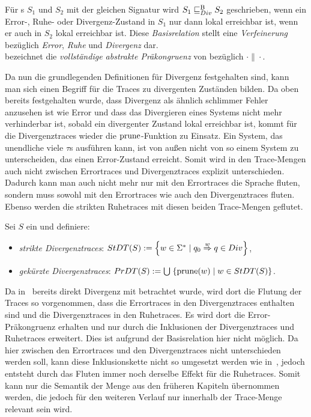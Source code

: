 \begin{Def}
\label{DefDivBasisrel}
Für \EIO{}s $S_1$ und $S_2$ mit der gleichen Signatur wird $S_1\sqsubseteq _{Div}^\mathrm{B} S_2$
geschrieben, wenn ein Error-, Ruhe- oder Divergenz-Zustand in $S_1$ nur
dann lokal erreichbar ist, wenn er auch in $S_2$ lokal erreichbar ist. Diese
\emph{Basisrelation} stellt eine \emph{Verfeinerung} bezüglich \emph{Error},
\emph{Ruhe} und \emph{Divergenz} dar.\\
\DCRel{} bezeichnet die \emph{vollständige abstrakte Präkongruenz} von \DBRel{}
bezüglich $\cdot\|\cdot$.
\end{Def}

Da nun die grundlegenden Definitionen für Divergenz festgehalten sind,
kann man sich einen Begriff für die Traces zu divergenten Zuständen
bilden. Da oben bereits festgehalten wurde, dass Divergenz als ähnlich
\glqq{}schlimmer Fehler\grqq{} anzusehen ist wie Error und dass das Divergieren
eines Systems nicht mehr verhinderbar ist, sobald ein divergenter Zustand lokal
erreichbar ist, kommt für die Divergenztraces wieder die $\mathrm{prune}$-Funktion zu
Einsatz. Ein System, das unendliche viele $\tau$s ausführen kann, ist von
außen nicht von so einem System zu unterscheiden, das einen Error-Zustand
erreicht. Somit wird in den Trace-Mengen auch nicht zwischen Errortraces und
Divergenztraces explizit unterschieden. Dadurch kann man auch nicht mehr nur mit
den Errortraces die Sprache fluten, sondern muss sowohl mit den Errortraces wie
auch den Divergenztraces fluten. Ebenso werden die strikten Ruhetraces mit
diesen beiden Trace-Mengen geflutet.

\begin{Def}[Divergenztraces]
  Sei $S$ ein \EIO{} und definiere:
  \begin{itemize}
    \item \emph{strikte Divergenztraces}: $StDT{}(S) := \left\{w\in\Sigma ^*\mid
      q_0 \overset{w}{\Rightarrow} q\in Div\right\}$,
    \item \emph{gekürzte Divergenztraces}: $PrDT{}(S) :=
      \bigcup\hspace{1pt}\left\{\mathrm{prune}{}(w)\mid w\in StDT{}(S)\right\}$.
  \end{itemize}
\end{Def}

Da in~\cite{Chilton2013} bereits direkt Divergenz mit betrachtet wurde, wird
dort die Flutung der Traces so vorgenommen, dass die Errortraces in den
Divergenztraces enthalten sind und die Divergenztraces in den Ruhetraces.
Es wird dort die Error-Präkongruenz erhalten und nur durch die Inklusionen der
Divergenztraces und Ruhetraces erweitert. Dies ist aufgrund der Basisrelation
hier nicht möglich. Da hier zwischen den Errortraces und den Divergenztraces
nicht unterschieden werden soll, kann diese Inklusionskette nicht so umgesetzt
werden wie in~\cite{Chilton2013}, jedoch
entsteht durch das Fluten immer noch derselbe Effekt für die Ruhetraces. Somit
kann nur die Semantik der Menge \ET{} aus den früheren Kapiteln übernommen
werden, die jedoch für den weiteren Verlauf nur innerhalb der Trace-Menge
\EDT{} relevant sein wird.

